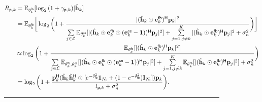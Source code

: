\documentclass[draftclsnofoot, onecolumn, comsoc, 12pt]{IEEEtran}
\begin{document}
\begin{figure*}[!t]
\begin{align}
    \label{RPEq1}
    \small
    R_{{\sf{p}},k} &= \mathbb{E}_{\mathbf{\theta}_k^{\sf{fb}}} [\log_{2}{(1+\gamma_{{\sf{p}},k})}\vert\hat{\mathbf{h}}_k] \nonumber \\
    &=\mathbb{E}_{\mathbf{\theta}_k^{\sf{fb}}} \bigg[\log_{2} 
    \bigg(1 + \frac{\vert(\hat{\mathbf{h}}_{k} \odot \mathbf{e}_{k}^{\sf{fb}})^{\sf{H}} \mathbf{p}_{k}\vert^{2}}{\sum\limits_{j \in \mathcal{L}}\mathbb{E}_{\mathbf{\theta}_k^{\sf{ce}}} [ \vert(\hat{\mathbf{h}}_{k} \odot \mathbf{e}_{k}^{\sf{fb}} \odot (\mathbf{e}_{k}^{\sf{ce}} - \mathbf{1}))^{\sf{H}} \mathbf{p}_{j}\vert^{2} ] + \sum\limits_{j=1 , j\neq k}^{K} \vert (\hat{\mathbf{h}}_{k} \odot \mathbf{e}_{k}^{\sf{fb}})^{\sf{H}} \mathbf{p}_{j}\vert^{2} + \sigma_{n}^{2}}\bigg) \bigg] \nonumber \\
    &\, {\approx} \log_{2} 
    \bigg(1 + \frac{\mathbb{E}_{\mathbf{\theta}_k^{\sf{fb}}} [ \vert(\hat{\mathbf{h}}_{k} \odot \mathbf{e}_{k}^{\sf{fb}})^{\sf{H}} \mathbf{p}_{k}\vert^{2} ] }{\sum\limits_{j \in \mathcal{L}}\mathbb{E}_{\mathbf{\theta}_k^{\sf{fb}}, \mathbf{\theta}_k^{\sf{ce}}} [ \vert(\hat{\mathbf{h}}_{k} \odot \mathbf{e}_{k}^{\sf{fb}} \odot (\mathbf{e}_{k}^{\sf{ce}} - \mathbf{1}))^{\sf{H}} \mathbf{p}_{j}\vert^{2} ] + \sum\limits_{j=1 , j\neq k}^{K} \mathbb{E}_{\mathbf{\theta}_k^{\sf{fb}}} [\vert(\hat{\mathbf{h}}_{k} \odot \mathbf{e}_{k}^{\sf{fb}})^{\sf{H}} \mathbf{p}_{j}\vert^{2} ] + \sigma_{n}^{2}}\bigg) \nonumber \\
    &= \log_{2}
    \bigg(1+\frac{\mathbf{p}_{k}^{\sf{H}}(\hat{\mathbf{h}}_{k} \hat{\mathbf{h}}_{k}^{\sf{H}} \odot
    [e^{-\delta_{\sf{fb}}^{2}}\mathbf{1}_{N_{{\sf{t}}}} + (1-e^{-\delta_{\sf{fb}}^{2}})\mathbf{I}_{N_{{\sf{t}}}}])\mathbf{p}_{k}}
    {l_{{\sf{p}},k} + \sigma_{n}^{2}} \bigg).
\end{align}
\noindent\rule{\textwidth}{.5pt}%
\end{figure*} 
\end{document}
